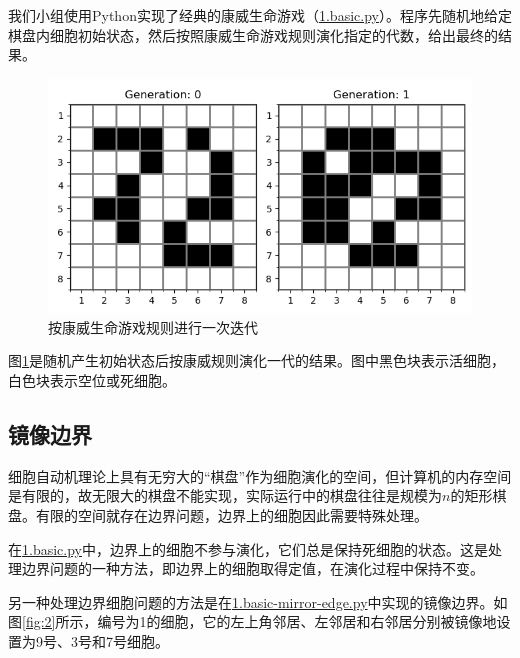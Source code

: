 \documentclass{ctexart}
\begin{document}
我们小组使用Python实现了经典的康威生命游戏（\underline{1.basic.py}）。程序先随机地给定棋盘内细胞初始状态，然后按照康威生命游戏规则演化指定的代数，给出最终的结果。

\begin{figure}[h]
  \centering
  \includegraphics[scale=0.75]{1.png}
  \caption{按康威生命游戏规则进行一次迭代}
  \label{fig:1}
\end{figure}

图\ref{fig:1}是随机产生初始状态后按康威规则演化一代的结果。图中黑色块表示活细胞，白色块表示空位或死细胞。

\subsection{镜像边界}

细胞自动机理论上具有无穷大的“棋盘”作为细胞演化的空间，但计算机的内存空间是有限的，故无限大的棋盘不能实现，实际运行中的棋盘往往是规模为$n$的矩形棋盘。有限的空间就存在边界问题，边界上的细胞因此需要特殊处理。

在\underline{1.basic.py}中，边界上的细胞不参与演化，它们总是保持死细胞的状态。这是处理边界问题的一种方法，即边界上的细胞取得定值，在演化过程中保持不变。

另一种处理边界细胞问题的方法是在\underline{1.basic-mirror-edge.py}中实现的镜像边界。如图\ref{fig:2}所示，编号为1的细胞，它的左上角邻居、左邻居和右邻居分别被镜像地设置为9号、3号和7号细胞。
\end{document}
